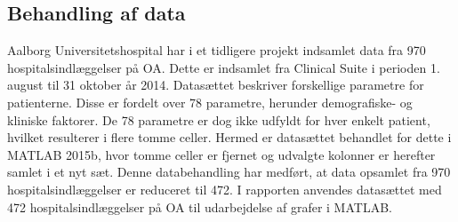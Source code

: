 \subsection{Behandling af data}
Aalborg Universitetshospital har i et tidligere projekt indsamlet data fra 970 hospitalsindlæggelser på OA. Dette er indsamlet fra Clinical Suite i perioden 1. august til 31 oktober år 2014. Datasættet beskriver forskellige parametre for patienterne. Disse er fordelt over 78 parametre, herunder demografiske- og kliniske faktorer. De 78 parametre er dog ikke udfyldt for hver enkelt patient, hvilket resulterer i flere tomme celler. Hermed er datasættet behandlet for dette i MATLAB 2015b, hvor tomme celler er fjernet og udvalgte kolonner er herefter samlet i et nyt sæt. Denne databehandling har medført, at data opsamlet fra 970 hospitalsindlæggelser er reduceret til 472. I rapporten anvendes datasættet med 472 hospitalsindlæggelser på OA til udarbejdelse af grafer i MATLAB. 
